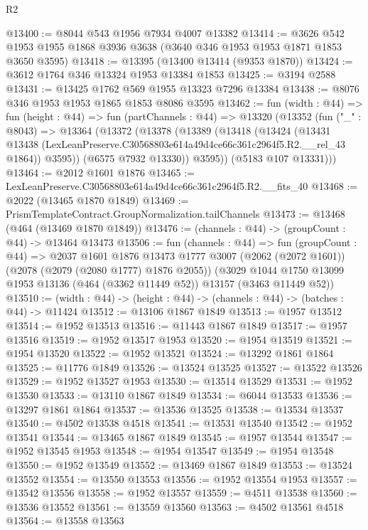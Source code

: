 \begin{lexlean}{R2}
\begin{coremodule}
@13400 := @8044 @543 @1956 @7934 @4007 @13382
@13414 := @3626 @542 @1953 @1955 @1868 @3936 @3638 (@3640 @346 @1953 @1953 @1871 @1853 @3650 @3595)
@13418 := @13395 (@13400 @13414 (@9353 @1870))
@13424 := @3612 @1764 @346 @13324 @1953 @13384 @1853
@13425 := @3194 @2588
@13431 := @13425 @1762 @569 @1955 @13323 @7296 @13384
@13438 := @8076 @346 @1953 @1953 @1865 @1853 @8086 @3595
@13462 := fun (width : @44) =>
  fun (height : @44) =>
  fun (partChannels : @44) =>
  @13320
    (@13352
      (fun ("_" : @8043) =>
      @13364
        (@13372
          (@13378
            (@13389
              (@13418
                (@13424
                  (@13431
                    @13438
                    (LexLeanPreserve.C30568803e614a49d4ce66c361c2964f5.R2.__rel_43 @1864))
                  @3595))
              (@6575 @7932 @13330))
            @3595))
        (@5183 @107 @13331)))
@13464 := @2012 @1601 @1876
@13465 := LexLeanPreserve.C30568803e614a49d4ce66c361c2964f5.R2.__fits_40
@13468 := @2022 (@13465 @1870 @1849)
@13469 := PrismTemplateContract.GroupNormalization.tailChannels
@13473 := @13468 (@464 (@13469 @1870 @1849))
@13476 := (channels : @44) -> (groupCount : @44) -> @13464 @13473
@13506 := fun (channels : @44) =>
  fun (groupCount : @44) =>
  @2037
    @1601
    @1876
    @13473
    @1777
    @3007
    (@2062 (@2072 @1601))
    (@2078 (@2079 (@2080 @1777) @1876 @2055))
    (@3029 @1044 @1750 @13099 @1953 @13136 (@464 (@3362 @11449 @52)) @13157 (@3463 @11449 @52))
@13510 := (width : @44) -> (height : @44) -> (channels : @44) -> (batches : @44) -> @11424
@13512 := @13106 @1867 @1849
@13513 := @1957 @13512
@13514 := @1952 @13513
@13516 := @11443 @1867 @1849
@13517 := @1957 @13516
@13519 := @1952 @13517 @1953
@13520 := @1954 @13519
@13521 := @1954 @13520
@13522 := @1952 @13521
@13524 := @13292 @1861 @1864
@13525 := @11776 @1849
@13526 := @13524 @13525
@13527 := @13522 @13526
@13529 := @1952 @13527 @1953
@13530 := @13514 @13529
@13531 := @1952 @13530
@13533 := @13110 @1867 @1849
@13534 := @6044 @13533
@13536 := @13297 @1861 @1864
@13537 := @13536 @13525
@13538 := @13534 @13537
@13540 := @4502 @13538 @4518
@13541 := @13531 @13540
@13542 := @1952 @13541
@13544 := @13465 @1867 @1849
@13545 := @1957 @13544
@13547 := @1952 @13545 @1953
@13548 := @1954 @13547
@13549 := @1954 @13548
@13550 := @1952 @13549
@13552 := @13469 @1867 @1849
@13553 := @13524 @13552
@13554 := @13550 @13553
@13556 := @1952 @13554 @1953
@13557 := @13542 @13556
@13558 := @1952 @13557
@13559 := @4511 @13538
@13560 := @13536 @13552
@13561 := @13559 @13560
@13563 := @4502 @13561 @4518
@13564 := @13558 @13563

\end{coremodule}
\end{lexlean}
